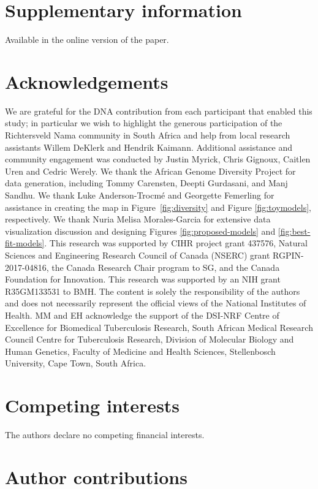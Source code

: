 \documentclass[]{article}
\begin{document}
{


\section*{Supplementary information}
Available in the online version of the paper.

\section*{Acknowledgements}

We are grateful for the DNA contribution from each participant that enabled
this study; in particular we wish to highlight the generous participation of
the Richtersveld Nama community in South Africa and help from local research
assistants Willem DeKlerk and Hendrik Kaimann. Additional assistance and
community engagement was conducted by Justin Myrick, Chris Gignoux, Caitlen
Uren and Cedric Werely. We thank the African Genome Diversity Project for data
generation, including Tommy Carensten, Deepti Gurdasani, and Manj Sandhu. We
thank Luke Anderson-Trocm\'e and Georgette Femerling for assistance in creating
the map in Figure~\ref{fig:diversity} and Figure \ref{fig:toymodels},
respectively. We thank Nuria Melisa Morales-Garcia for extensive data
visualization discussion and designing Figures \ref{fig:proposed-models} and
\ref{fig:best-fit-models}. This research was supported by CIHR project grant 437576,
Natural Sciences and Engineering Research Council of Canada (NSERC) grant RGPIN-2017-04816, the Canada Research Chair program to SG, and the Canada Foundation for Innovation. 
This research was supported by an NIH grant
R35GM133531 to BMH. The content is solely the responsibility of the authors
and does not necessarily represent the official views of the National
Institutes of Health. MM and EH acknowledge the support of the DSI-NRF Centre of Excellence for 
Biomedical Tuberculosis Research, South African Medical Research Council Centre for Tuberculosis 
Research, Division of Molecular Biology and Human Genetics, Faculty of Medicine and Health Sciences, 
Stellenbosch University, Cape Town, South Africa.

\section*{Competing interests}
The authors declare no competing financial interests.

\section*{Author contributions}

}
\end{document}
